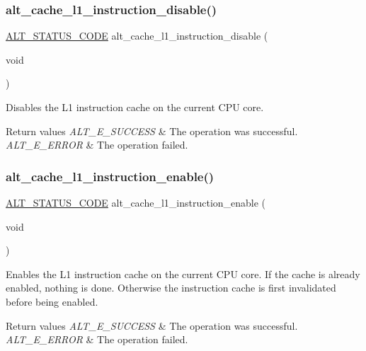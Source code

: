 \subsubsection{\texorpdfstring{alt\_cache\_l1\_instruction\_disable()}{alt\_cache\_l1\_instruction\_disable()}}
{\footnotesize\ttfamily \mbox{\hyperlink{hwlib_8h_abdb0d369f069723ca55d6c94bcaaaa12}{A\+L\+T\+\_\+\+S\+T\+A\+T\+U\+S\+\_\+\+C\+O\+DE}} alt\+\_\+cache\+\_\+l1\+\_\+instruction\+\_\+disable (\begin{DoxyParamCaption}\item[{void}]{ }\end{DoxyParamCaption})}

Disables the L1 instruction cache on the current C\+PU core.


\begin{DoxyRetVals}{Return values}
{\em A\+L\+T\+\_\+\+E\+\_\+\+S\+U\+C\+C\+E\+SS} & The operation was successful. \\
\hline
{\em A\+L\+T\+\_\+\+E\+\_\+\+E\+R\+R\+OR} & The operation failed. \\
\hline
\end{DoxyRetVals}
\mbox{\label{group__CACHE__L1_ga42b3e61800effdf4f2c116a91b552cfc}} 
\subsubsection{\texorpdfstring{alt\_cache\_l1\_instruction\_enable()}{alt\_cache\_l1\_instruction\_enable()}}
{\footnotesize\ttfamily \mbox{\hyperlink{hwlib_8h_abdb0d369f069723ca55d6c94bcaaaa12}{A\+L\+T\+\_\+\+S\+T\+A\+T\+U\+S\+\_\+\+C\+O\+DE}} alt\+\_\+cache\+\_\+l1\+\_\+instruction\+\_\+enable (\begin{DoxyParamCaption}\item[{void}]{ }\end{DoxyParamCaption})}

Enables the L1 instruction cache on the current C\+PU core. If the cache is already enabled, nothing is done. Otherwise the instruction cache is first invalidated before being enabled.


\begin{DoxyRetVals}{Return values}
{\em A\+L\+T\+\_\+\+E\+\_\+\+S\+U\+C\+C\+E\+SS} & The operation was successful. \\
\hline
{\em A\+L\+T\+\_\+\+E\+\_\+\+E\+R\+R\+OR} & The operation failed. \\
\hline
\end{DoxyRetVals}
\mbox{\label{group__CACHE__L1_gac7c91159bfa1efb23f5f8b1c1a633050}} 
